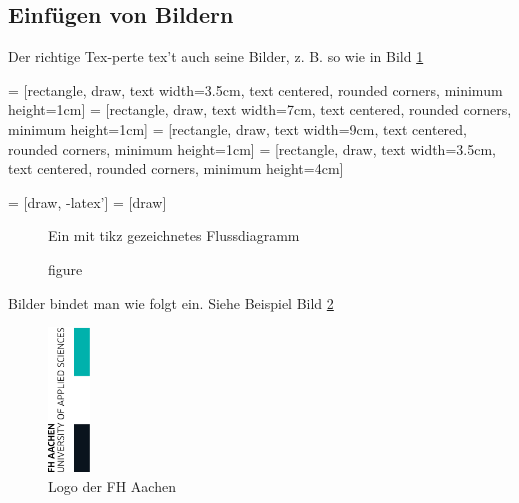 \subsection{Einfügen von Bildern}

Der richtige Tex-perte tex't auch seine Bilder, z. B. so wie in Bild \ref{bild2}

	 = [rectangle, draw, 
    text width=3.5cm, text centered, rounded corners, minimum height=1cm]
	 = [rectangle, draw, 
    text width=7cm, text centered, rounded corners, minimum height=1cm]
	 = [rectangle, draw, 
    text width=9cm, text centered, rounded corners, minimum height=1cm]
	 = [rectangle, draw, 
    text width=3.5cm, text centered, rounded corners, minimum height=4cm]
	 
	 = [draw, -latex']
	 = [draw]

\begin{figure}
\begin{center}
\caption{figure}{Ein mit tikz gezeichnetes Flussdiagramm}
\label{bild2}
\end{center}
\end{figure}
Bilder bindet man wie folgt ein. Siehe Beispiel Bild \ref{bild1}

\begin{figure}[h]
\centering
\includegraphics[width=0.1\textwidth]{fh_logo.png}
\caption{Logo der FH Aachen}
\label{bild1}
\end{figure}


\blindtext


